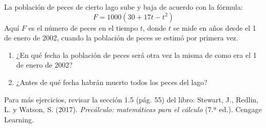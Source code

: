 \documentclass[a4,11pt]{aleph-notas}
\begin{document}
\begin{ejer}
    La población de peces de cierto lago sube y baja de acuerdo con la fórmula:
    \[
        F = 1000(30 + 17t - t^2)
    \]
    Aquí \(F\) es el número de peces en el tiempo \(t\), donde \(t\) se mide en años desde el 1 de enero de 2002, cuando la población de peces se estimó por primera vez.
    
    \begin{enumerate}
        \item ¿En qué fecha la población de peces será otra vez la misma de como era el 1 de enero de 2002?
        \item ¿Antes de qué fecha habrán muerto todos los peces del lago?
    \end{enumerate}
\end{ejer}


\begin{advertencia}
    Para más ejercicios, revisar la sección 1.5 (pág. 55) del libro: Stewart, J., Redlin, L. y Watson, S. (2017). \textit{Precálculo: matemáticas para el cálculo} (7.ª ed.). Cengage Learning.
\end{advertencia}
\end{document}
